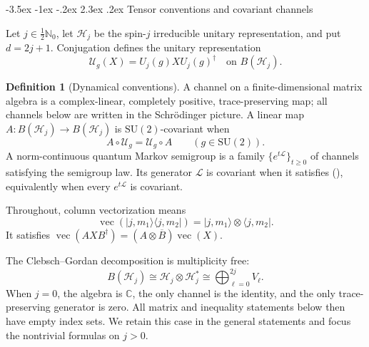 \documentclass[twoside,10pt]{article}
\makeatletter
\numberwithin{equation}{section}
\theoremstyle{slbody}
\theoremstyle{definition}
\newtheorem{definition}[theorem]{Definition}
\theoremstyle{remark}
\newcommand{\SU}{\mathrm{SU}(2)}
\newcommand{\cL}{\mathcal L}
\newcommand{\cU}{\mathcal U}
\renewcommand{\section}{%
  \@startsection{section}{1}{\z@}%
    {-3.5ex \@plus -1ex \@minus -.2ex}%
    {2.3ex \@plus .2ex}%
    {\normalfont\large\bfseries}}
\renewcommand{\eqref}[1]{%
  \textup{{\normalfont(\oldstylenums{\ref{#1}}}\normalfont)}}
\makeatother
\begin{document}
\section{Tensor conventions and covariant channels}

Let \(j\in\tfrac12\mathbb N_0\), let \(\mathcal H_j\) be the spin-\(j\)
irreducible unitary representation, and put \(d=2j+1\).  Conjugation
defines the unitary representation
\[
  \cU_g(X)=U_j(g)XU_j(g)^\dagger
  \quad\text{on }B(\mathcal H_j).
\]

\begin{definition}[Dynamical conventions]\label{def:dynamical-conventions}
A channel on a finite-dimensional matrix algebra is a complex-linear,
completely positive, trace-preserving map; all channels below are written
in the Schr\"odinger picture.  A linear map \(A:B(\mathcal H_j)\to
B(\mathcal H_j)\) is \(\SU\)-covariant when
\begin{equation}\label{eq:covariance-definition}
 A\circ\cU_g=\cU_g\circ A\qquad(g\in\SU).
\end{equation}
A norm-continuous quantum Markov semigroup is a family
\(\{e^{t\cL}\}_{t\geq0}\) of channels satisfying the semigroup law.
Its generator \(\cL\) is covariant when it satisfies
\eqref{eq:covariance-definition}, equivalently when every
\(e^{t\cL}\) is covariant.
\end{definition}

Throughout, column vectorization means
\begin{equation}\label{eq:column-vectorization}
 \operatorname{vec}(|j,m_1\rangle\langle j,m_2|)
 =|j,m_1\rangle\otimes\langle j,m_2|.
\end{equation}
It satisfies
\(\operatorname{vec}(AXB^\dagger)
=(A\otimes\overline B)\operatorname{vec}(X)\).

The Clebsch--Gordan decomposition is multiplicity free:
\begin{equation}\label{eq:adjoint-decomposition}
  B(\mathcal H_j)\cong \mathcal H_j\otimes\mathcal H_j^*
  \cong \bigoplus_{\ell=0}^{2j}V_\ell.
\end{equation}
When \(j=0\), the algebra is \(\mathbb C\), the only channel is the
identity, and the only trace-preserving generator is zero.  All matrix
and inequality statements below then have empty index sets.  We retain
this case in the general statements and focus the nontrivial formulas on
\(j>0\).
\end{document}

